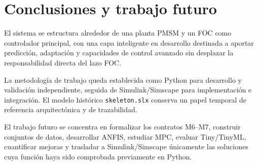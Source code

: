 \section{Conclusiones y trabajo futuro}

El sistema se estructura alrededor de una planta PMSM y un FOC como controlador principal, con una capa inteligente en desarrollo destinada a aportar predicción, adaptación y capacidades de control avanzado sin desplazar la responsabilidad directa del lazo FOC.

La metodología de trabajo queda establecida como Python para desarrollo y validación independiente, seguida de Simulink/Simscape para implementación e integración. El modelo histórico \texttt{skeleton.slx} conserva un papel temporal de referencia arquitectónica y de trazabilidad.

El trabajo futuro se concentra en formalizar los contratos M6--M7, construir conjuntos de datos, desarrollar ANFIS, estudiar MPC, evaluar Tiny/TinyML, cuantificar mejoras y trasladar a Simulink/Simscape únicamente las soluciones cuya función haya sido comprobada previamente en Python.
